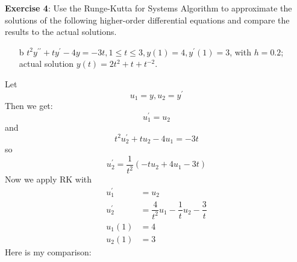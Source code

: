 \documentclass{article}
\begin{document}
\textbf{Exercise 4}: Use the Runge-Kutta for Systems Algorithm to approximate the solutions of the following higher-order differential equations and compare the results to the actual solutions.
    \begin{itemize}
        \item [b] $t^{2}y^{\prime\prime} + ty^{\prime} - 4y = -3t, 1 \leq t \leq 3, y(1) = 4, y^{\prime}(1) = 3$, with $h = 0.2$; actual solution $y(t) = 2t^{2} + t + t^{-2}$.
    \end{itemize}
    \begin{answer}
        Let 
            \begin{equation*}
                u_{1} = y, u_{2} = y^{\prime}
            \end{equation*}
        Then we get:
            \begin{equation*}
                u_{1}^{\prime} = u_{2}
            \end{equation*}
        and
            \begin{equation*}
                t^{2}u_{2}^{\prime} + tu_{2} - 4u_{1} = -3t
            \end{equation*}
        so
            \begin{equation*}
                u_{2}^{\prime} = \dfrac{1}{t^{2}}(-tu_{2} + 4u_{1} -3t)
            \end{equation*}
        Now we apply RK with 
            \begin{align*}
                u_{1}^{\prime} &= u_{2}                                                    \\
                u_{2}^{\prime} &= \dfrac{4}{t^{2}}u_{1} - \dfrac{1}{t}u_{2} - \dfrac{3}{t} \\
                u_{1}(1)       &= 4                                                        \\
                u_{2}(1)       &= 3                                                          
            \end{align*}
        Here is my comparison:
            \begin{center}

\end{center}
\end{answer}
\end{document}
